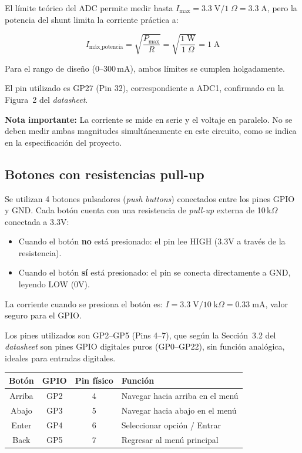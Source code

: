 \documentclass[letterpaper,12pt]{article}
\begin{document}
    El límite teórico del ADC permite medir hasta $I_{\max} = 3.3\;\text{V}/1\;\Omega = 3.3\;\text{A}$, pero la potencia del shunt limita la corriente práctica a:

    \begin{equation}
        I_{\text{máx\_potencia}} = \sqrt{\frac{P_{\max}}{R}} = \sqrt{\frac{1\;\text{W}}{1\;\Omega}} = 1\;\text{A}
    \end{equation}

    Para el rango de diseño (0--300\,mA), ambos límites se cumplen holgadamente.

    El pin utilizado es GP27 (Pin 32), correspondiente a ADC1, confirmado en la Figura~2 del \textit{datasheet}.

    \textbf{Nota importante:} La corriente se mide en serie y el voltaje en paralelo. No se deben medir ambas magnitudes simultáneamente en este circuito, como se indica en la especificación del proyecto.

    \subsection{Botones con resistencias pull-up}

    Se utilizan 4 botones pulsadores (\textit{push buttons}) conectados entre los pines GPIO y GND. Cada botón cuenta con una resistencia de \textit{pull-up} externa de 10\,k$\Omega$ conectada a 3.3V:

    \begin{itemize}
        \item Cuando el botón \textbf{no} está presionado: el pin lee HIGH (3.3V a través de la resistencia).
        \item Cuando el botón \textbf{sí} está presionado: el pin se conecta directamente a GND, leyendo LOW (0V).
    \end{itemize}

    La corriente cuando se presiona el botón es: $I = 3.3\;\text{V} / 10\;\text{k}\Omega = 0.33\;\text{mA}$, valor seguro para el GPIO.

    Los pines utilizados son GP2--GP5 (Pins 4--7), que según la Sección~3.2 del \textit{datasheet} son pines GPIO digitales puros (GP0--GP22), sin función analógica, ideales para entradas digitales.

    \begin{center}
    \begin{tabular}{|c|c|c|l|}
        \hline
        \textbf{Botón} & \textbf{GPIO} & \textbf{Pin físico} & \textbf{Función} \\
        \hline
        Arriba & GP2 & 4 & Navegar hacia arriba en el menú \\
        Abajo & GP3 & 5 & Navegar hacia abajo en el menú \\
        Enter & GP4 & 6 & Seleccionar opción / Entrar \\
        Back & GP5 & 7 & Regresar al menú principal \\
        \hline
    \end{tabular}
    \end{center}
\end{document}
